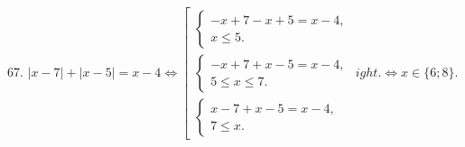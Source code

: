 67. $|x-7|+|x-5|=x-4\Leftrightarrow \left[\begin{array}{l}\begin{cases} -x+7-x+5=x-4,\\ x\leqslant 5.\end{cases}\\
\begin{cases} -x+7+x-5=x-4,\\ 5\leqslant x\leqslant 7 .\end{cases}\\\begin{cases} x-7+x-5=x-4,\\ 7\leqslant x.\end{cases}\end{array}
ight.\Leftrightarrow
x\in\{6;8\}.$\\
